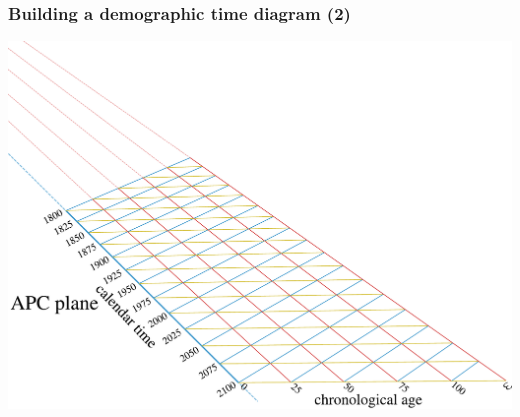 \documentclass[20pt]{beamer}
\begin{document}
\begin{frame}
\frametitle{Building a demographic time diagram (2)}
\vspace{-1em}
\begin{center}
\includegraphics[scale=.8]{Figures/buildTAL1.pdf}
\end{center}
\end{frame}
\end{document}
